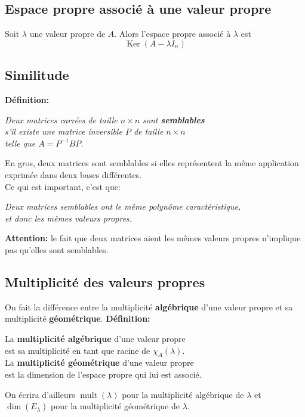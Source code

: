 \documentclass{article}
\DeclareMathOperator{\ke}{Ker}
\DeclareMathOperator{\mult}{mult}
\begin{document}
\subsection{Espace propre associé à une valeur propre}
Soit \(\lambda\) une valeur propre de \(A\). Alors l'espace propre associé à \(\lambda\) est
\begin{equation}
	\ke(A-\lambda I_n)
\end{equation}

\subsection{Similitude}
\textbf{Définition:}
\begin{center}
	\emph{Deux matrices carrées de taille \(n \times n\) sont \textbf{semblables} \\ s'il existe une matrice inversible \(P\) de taille \(n \times n\) \\ telle que \(A = P^{-1}BP\).}
\end{center}

En gros, deux matrices sont semblables si elles représentent la même application exprimée dans deux bases différentes. \\
Ce qui est important, c'est que:
\begin{center}
	\emph{Deux matrices semblables ont le même polynôme caractéristique, \\ et donc les mêmes valeurs propres.}
\end{center}
\textbf{Attention:} le fait que deux matrices aient les mêmes valeurs propres n'implique pas qu'elles sont semblables.

\subsection{Multiplicité des valeurs propres}
On fait la différence entre la multiplicité \textbf{algébrique} d'une valeur propre et sa multiplicité \textbf{géométrique}.
\textbf{Définition:}
\begin{center}
	La \textbf{multiplicité algébrique} d'une valeur propre \\ est sa multiplicité en tant que racine de \(\chi_A(\lambda)\). \\ \vspace{10pt}
	La \textbf{multiplicité géométrique} d'une valeur propre \\ est la dimension de l'espace propre qui lui est associé.
\end{center}
On écrira d'ailleurs \(\mult(\lambda)\) pour la multiplicité algébrique de \(\lambda\) et \(\dim(E_\lambda)\) pour la multiplicité géométrique de \(\lambda\).
\end{document}
